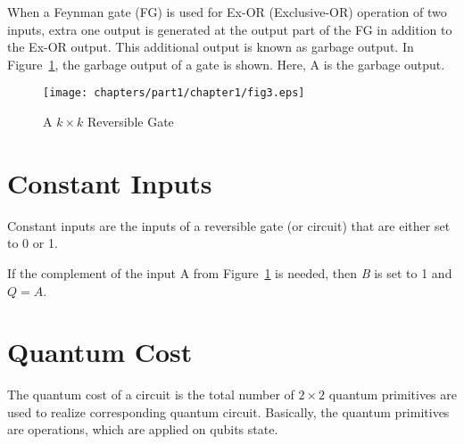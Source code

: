 
\begin{example}\textnormal{
When a Feynman gate (FG) is used for Ex-OR (Exclusive-OR) operation of two inputs, extra one output is generated at the output part of the FG in addition to the Ex-OR output. This additional output is known as garbage output. In Figure~\ref{fig:p1_c1_fig3}, the garbage output of a gate is shown. Here, A is the garbage output.}
\end{example}

\begin{figure}[H]
\centering
\texttt{[image: chapters/part1/chapter1/fig3.eps]}
\caption{A $k \times k$ Reversible Gate}
\label{fig:p1_c1_fig3}
\end{figure}

\section{Constant Inputs}
Constant inputs are the inputs of a reversible gate (or circuit) that are either set to 0 or 1.

\begin{example}\textnormal{
If the complement of the input A from Figure~\ref{fig:p1_c1_fig3} is needed, then \textit{B} is set to 1 and $Q = A$.}
\end{example}

\section{Quantum Cost}

The quantum cost of a circuit is the total number of $2 \times 2$ quantum primitives are used to realize corresponding quantum circuit. Basically, the quantum primitives are  operations, which are applied on qubits state.%



